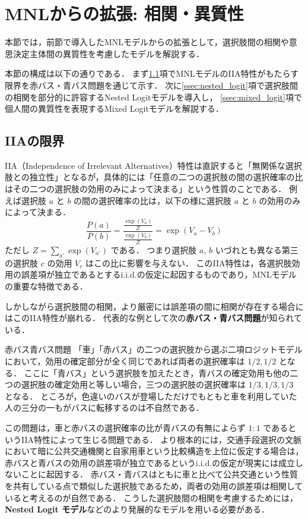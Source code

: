 \section{MNLからの拡張: 相関・異質性}\label{sec:correlation}
本節では，前節で導入したMNLモデルからの拡張として，選択肢間の相関や意思決定主体間の異質性を考慮したモデルを解説する．

本節の構成は以下の通りである．
まず\ref{ssec:iia_limit}項でMNLモデルのIIA特性がもたらす限界を赤バス・青バス問題を通じて示す．
次に\ref{ssec:nested_logit}項で選択肢間の相関を部分的に許容するNested Logitモデルを導入し，
\ref{ssec:mixed_logit}項で個人間の異質性を表現するMixed Logitモデルを解説する．

\subsection{IIAの限界}\label{ssec:iia_limit}
IIA（Independence of Irrelevant Alternatives）特性は直訳すると「無関係な選択肢との独立性」となるが，具体的には「任意の二つの選択肢の間の選択確率の比はその二つの選択肢の効用のみによって決まる」という性質のことである．
例えば選択肢 $a$ と $b$ の間の選択確率の比は，以下の様に選択肢 $a$ と $b$ の効用のみによって決まる．
\begin{equation}
  \frac{P(a)}{P(b)} = \frac{\frac{\exp(V_a)}{Z}}{\frac{\exp(V_b)}{Z}} = \exp(V_a - V_b)
\end{equation}
ただし $Z = \sum_{a'} \exp(V_{a'})$ である．
つまり選択肢 $a$, $b$ いづれとも異なる第三の選択肢 $c$ の効用 $V_c$ はこの比に影響を与えない．
このIIA特性は，各選択肢効用の誤差項が独立であるとするi.i.d.の仮定に起因するものであり，MNLモデルの重要な特徴である．

しかしながら選択肢間の相関，より厳密には誤差項の間に相関が存在する場合にはこのIIA特性が崩れる．
代表的な例として次の\textbf{赤バス・青バス問題}が知られている．

\begin{itembox}[l]{赤バス青バス問題}
    「車」「赤バス」の二つの選択肢から選ぶ二項ロジットモデルにおいて，効用の確定部分が全く同じであれば両者の選択確率は $1/2, 1/2$ となる．
    ここに「青バス」という選択肢を加えたとき，青バスの確定効用も他の二つの選択肢の確定効用と等しい場合，三つの選択肢の選択確率は $1/3, 1/3, 1/3$ となる．
    ところが，色違いのバスが登場しただけでもともと車を利用していた人の三分の一もがバスに転移するのは不自然である．
\end{itembox}

この問題は，車と赤バスの選択確率の比が青バスの有無によらず $1:1$ であるというIIA特性によって生じる問題である．
より根本的には，交通手段選択の文脈において暗に公共交通機関と自家用車という比較構造を上位に仮定する場合は，赤バスと青バスの効用の誤差項が独立であるというi.i.d.の仮定が現実には成立しないことに起因する．
赤バス・青バスはともに車と比べて公共交通という性質を共有している点で類似した選択肢であるため，両者の効用の誤差項は相関していると考えるのが自然である．
こうした選択肢間の相関を考慮するためには，\textbf{Nested Logit モデル}などのより発展的なモデルを用いる必要がある．



